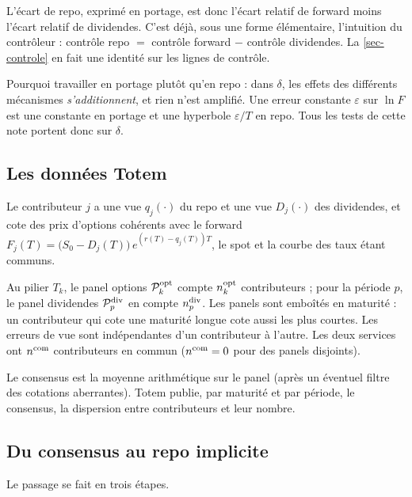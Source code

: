 L'écart de repo, exprimé en portage, est donc l'écart relatif de forward moins l'écart relatif de dividendes. C'est
déjà, sous une forme élémentaire, l'intuition du contrôleur : contrôle repo $=$ contrôle forward $-$ contrôle
dividendes. La \cref{sec-controle} en fait une identité sur les lignes de contrôle.

\begin{retenir}
Pourquoi travailler en portage plutôt qu'en repo : dans $\delta$, les effets des différents mécanismes
\emph{s'additionnent}, et rien n'est amplifié. Une erreur constante $\varepsilon$ sur $\ln F$ est une constante en
portage et une hyperbole $\varepsilon/T$ en repo. Tous les tests de cette note portent donc sur $\delta$.
\end{retenir}

\subsection{Les données Totem}
\begin{assumption}\label{hyp-coherent}
Le contributeur $j$ a une vue $q_j(\cdot)$ du repo et une vue $D_j(\cdot)$ des dividendes, et cote des prix d'options
cohérents avec le forward $F_j(T)=\bigl(S_0-D_j(T)\bigr)\,e^{(r(T)-q_j(T))T}$, le spot et la courbe des taux étant
communs.
\end{assumption}

\begin{assumption}[Panels]\label{hyp-panels}
Au pilier $T_k$, le panel options $\mathcal{P}^{\mathrm{opt}}_k$ compte $n^{\mathrm{opt}}_k$ contributeurs ; pour la période $p$, le panel
dividendes $\mathcal{P}^{\mathrm{div}}_p$ en compte $n^{\mathrm{div}}_p$. Les panels sont emboîtés en maturité : un contributeur qui cote une
maturité longue cote aussi les plus courtes. Les erreurs de vue sont indépendantes d'un contributeur à l'autre. Les
deux services ont $n^{\mathrm{com}}$ contributeurs en commun ($n^{\mathrm{com}}=0$ pour des panels disjoints).
\end{assumption}

\begin{assumption}[Consensus]\label{hyp-consensus}
Le consensus est la moyenne arithmétique sur le panel (après un éventuel filtre des cotations aberrantes). Totem publie,
par maturité et par période, le consensus, la dispersion entre contributeurs et leur nombre.
\end{assumption}

\subsection{Du consensus au repo implicite}\label{sec-bootstrap}
Le passage se fait en trois étapes.

